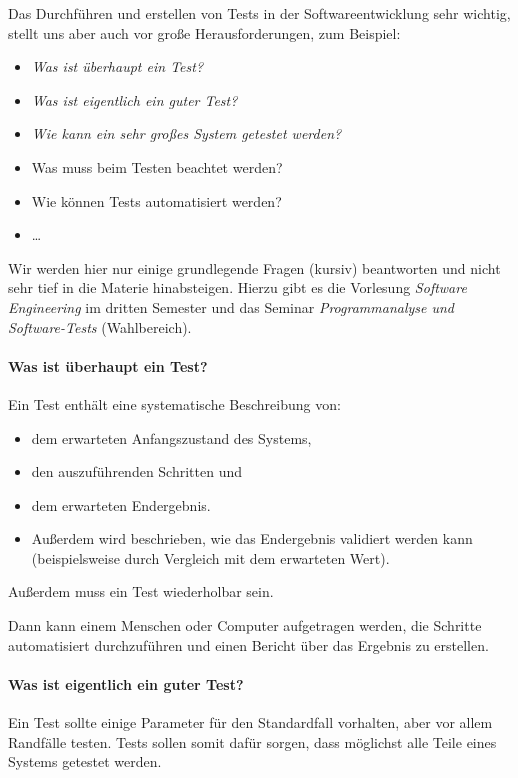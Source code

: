 
Das Durchführen und erstellen von Tests in der Softwareentwicklung sehr wichtig, stellt uns aber auch vor große Herausforderungen, zum Beispiel:
\begin{itemize}
	\item \textit{Was ist überhaupt ein Test?}
	\item \textit{Was ist eigentlich ein guter Test?}
	\item \textit{Wie kann ein sehr großes System getestet werden?}
	\item Was muss beim Testen beachtet werden?
	\item Wie können Tests automatisiert werden?
	\item \dots
\end{itemize}

Wir werden hier nur einige grundlegende Fragen (kursiv) beantworten und nicht sehr tief in die Materie hinabsteigen. Hierzu gibt es die Vorlesung \textit{Software Engineering} im dritten Semester und das Seminar \textit{Programmanalyse und Software-Tests} (Wahlbereich).

\paragraph{Was ist überhaupt ein Test?}
	Ein Test enthält eine systematische Beschreibung von:
	\begin{itemize}
		\item dem erwarteten Anfangszustand des Systems,
		\item den auszuführenden Schritten und
		\item dem erwarteten Endergebnis.
		\item Außerdem wird beschrieben, wie das Endergebnis validiert werden kann (beispielsweise durch Vergleich mit dem erwarteten Wert).
	\end{itemize}
	Außerdem muss ein Test wiederholbar sein.
	
	Dann kann einem Menschen oder Computer aufgetragen werden, die Schritte automatisiert durchzuführen und einen Bericht über das Ergebnis zu erstellen.

\paragraph{Was ist eigentlich ein guter Test?}
	Ein Test sollte einige Parameter für den Standardfall vorhalten, aber vor allem Randfälle testen. Tests sollen somit dafür sorgen, dass möglichst alle Teile eines Systems getestet werden.
	
